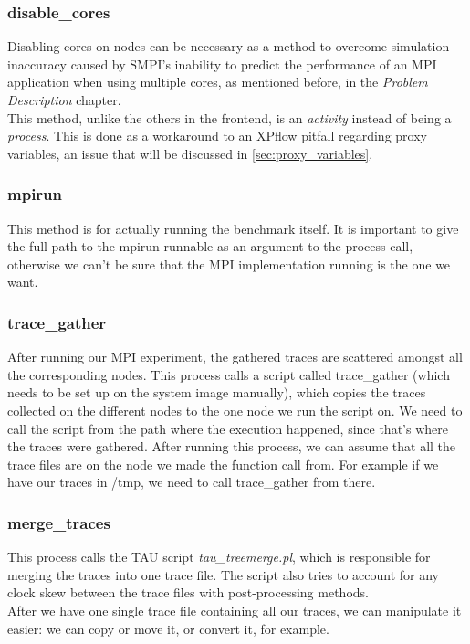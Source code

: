 \subsubsection{disable\_cores}
Disabling cores on nodes can be necessary
as a method to overcome simulation inaccuracy caused by SMPI's
inability to predict the performance of an MPI application when using
multiple cores, as mentioned before, in the \emph{Problem Description}
chapter.\\
This method, unlike the others in the frontend, is an \emph{activity}
instead of being a \emph{process}. This is done as a workaround to an
XPflow pitfall regarding proxy variables, an issue that will be
discussed in \ref{sec:proxy_variables}.
\subsubsection{mpirun}
This method is for actually running the benchmark
itself. It is important to give the full path to the mpirun runnable
as an argument to the process call, otherwise we can't be sure that
the MPI implementation running is the one we want.
\subsubsection{trace\_gather}
After running our MPI experiment, the gathered traces are scattered
amongst all the corresponding nodes. This process calls a script
called trace\_gather (which needs to be set up on the system image
manually), which copies the traces collected on the
different nodes to the one node we run the script on. We need to call
the script from the path where the execution happened, since that's
where the traces were gathered. After running
this process, we can assume that all the trace files are on the node
we made the function call from. For example if we have our traces in
/tmp, we need to call trace\_gather from there.
\subsubsection{merge\_traces}
This process calls the TAU\cite{sm06}
script \emph{tau\_treemerge.pl}, which is responsible for merging the
traces into one trace file. The script also tries to account for any
clock skew between the trace files with post-processing methods.\\
After we have one single trace file containing all our traces, we can
manipulate it easier: we can copy or move it, or convert it, for
example.
